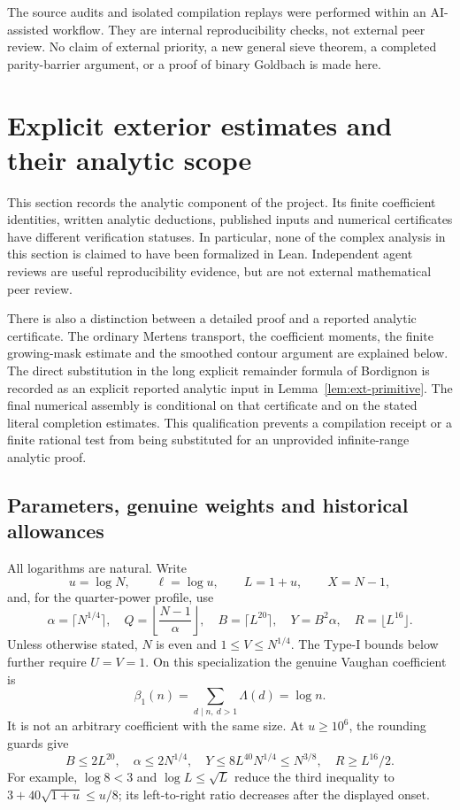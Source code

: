 \documentclass[11pt,a4paper]{article}
\theoremstyle{definition}
\theoremstyle{remark}
\begin{document}
The source audits and isolated compilation replays were performed
within an AI-assisted workflow.  They are internal reproducibility
checks, not external peer review.  No claim of external priority,
a new general sieve theorem, a completed parity-barrier argument,
or a proof of binary Goldbach is made here.


\section{Explicit exterior estimates and their analytic scope}
\label{sec:exterior}

This section records the analytic component of the project. Its finite
coefficient identities, written analytic deductions, published inputs and
numerical certificates have different verification statuses. In particular,
none of the complex analysis in this section is claimed to have been
formalized in Lean. Independent agent reviews are useful reproducibility
evidence, but are not external mathematical peer review.

There is also a distinction between a detailed proof and a reported
analytic certificate. The ordinary Mertens transport, the coefficient
moments, the finite growing-mask estimate and the smoothed contour argument
are explained below. The direct substitution in the long explicit remainder
formula of Bordignon is recorded as an explicit reported analytic input in
Lemma~\ref{lem:ext-primitive}. The final numerical assembly is conditional
on that certificate and on the stated literal completion estimates. This
qualification prevents a compilation receipt or a finite rational test from
being substituted for an unprovided infinite-range analytic proof.

\subsection{Parameters, genuine weights and historical allowances}

All logarithms are natural. Write
\[
 u=\log N,\qquad \ell=\log u,\qquad L=1+u,
 \qquad X=N-1,
\]
and, for the quarter-power profile, use
\[
 \alpha=\lceil N^{1/4}\rceil,\quad
 Q=\left\lfloor\frac{N-1}{\alpha}\right\rfloor,\quad
 B=\lceil L^{20}\rceil,\quad Y=B^2\alpha,\quad
 R=\lfloor L^{16}\rfloor.
\]
Unless otherwise stated, $N$ is even and $1\leq V\leq N^{1/4}$.
The Type-I bounds below further require $U=V=1$. On this specialization
the genuine Vaughan coefficient is
\[
 \beta_1(n)=\sum_{d\mid n,\ d>1}\Lambda(d)=\log n.
\]
It is not an arbitrary coefficient with the same size. At $u\geq10^6$,
the rounding guards give
\[
 B\leq2L^{20},\quad \alpha\leq2N^{1/4},\quad
 Y\leq8L^{40}N^{1/4}\leq N^{3/8},\quad
 R\geq L^{16}/2.
\]
For example, $\log8<3$ and $\log L\leq\sqrt L$ reduce the third
inequality to $3+40\sqrt{1+u}\leq u/8$; its left-to-right ratio
decreases after the displayed onset.
\end{document}
